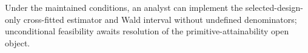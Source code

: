 Under the maintained conditions, an analyst can implement the selected-design-only cross-fitted estimator and Wald interval without undefined denominators; unconditional feasibility awaits resolution of the primitive-attainability open object.